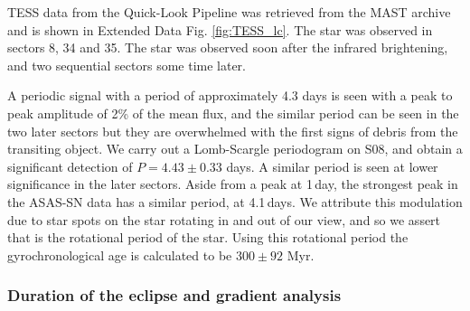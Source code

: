 \documentclass[sn-nature]{sn-jnl}%
\begin{document}
TESS data from the Quick-Look Pipeline \cite{2020RNAAS...4..204H,2021RNAAS...5..234K} was retrieved from the MAST archive and is shown in Extended Data Fig. \ref{fig:TESS_lc}.
%
The star was observed in sectors 8, 34 and 35.
%
The star was observed soon after the infrared brightening, and two sequential sectors some time later.

A periodic signal with a period of approximately 4.3 days is seen with a peak to peak amplitude of 2\% of the mean flux, and the similar period can be seen in the two later sectors but they are overwhelmed with the first signs of debris from the transiting object.
%
We carry out a Lomb-Scargle periodogram on S08, and obtain a significant detection of $P=4.43\pm 0.33$ days.
%
A similar period is seen at lower significance in the later sectors.
%
Aside from a peak at 1\,day, the  strongest peak in the ASAS-SN data has a similar period, at 4.1\,days.
%
We attribute this modulation due to star spots on the star rotating in and out of our view, and so we assert that is the rotational period of the star.
%
Using this rotational period the gyrochronological age \cite{Bouma23,Kounkel22} is calculated to be $300\pm92$ Myr.




\subsubsection*{Duration of the eclipse and gradient analysis}
\end{document}
